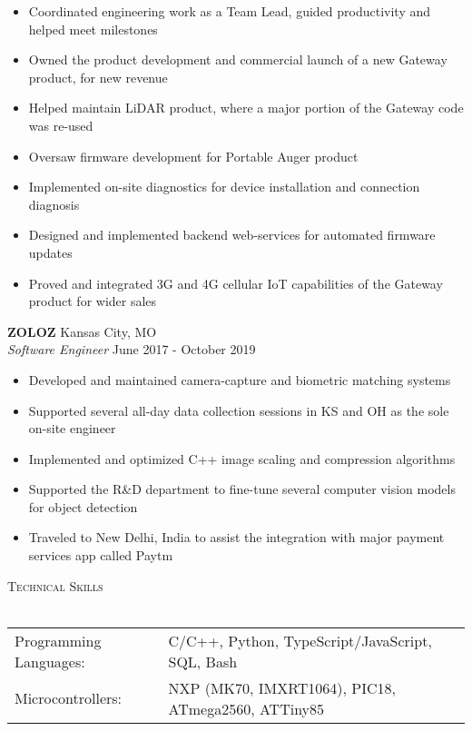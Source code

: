 \documentclass[a4paper]{article}
\newcommand{\lineunder} {
    \vspace*{-8pt} \\
    \hspace*{-18pt} \hrulefill \\
}
\newcommand{\header} [1] {
    {\hspace*{-18pt}\vspace*{6pt} \textsc{#1}}
    \vspace*{-6pt} \lineunder
}
\begin{document}
\begin{itemize} \itemsep 1pt
	\item Coordinated engineering work as a Team Lead, guided productivity and helped meet milestones
	\item Owned the product development and commercial launch of a new Gateway product, for new revenue
	\item Helped maintain LiDAR product, where a major portion of the Gateway code was re-used
	\item Oversaw firmware development for Portable Auger product
	\item Implemented on-site diagnostics for device installation and connection diagnosis
	\item Designed and implemented backend web-services for automated firmware updates
	\item Proved and integrated 3G and 4G cellular IoT capabilities of the Gateway product for wider sales
\end{itemize}
\textbf{ZOLOZ} \hfill Kansas City, MO\\
\textit{Software Engineer} \hfill June 2017 - October 2019\\
\vspace{-1mm}
\begin{itemize} \itemsep 1pt
	\item Developed and maintained camera-capture and biometric matching systems
	\item Supported several all-day data collection sessions in KS and OH as the sole on-site engineer
	\item Implemented and optimized C++ image scaling and compression algorithms
	\item Supported the R\&D department to fine-tune several computer vision models for object detection
	\item Traveled to New Delhi, India to assist the integration with major payment services app called Paytm
\end{itemize}

\header{Technical Skills}
\begin{tabular}{ l l }
    \vspace{1mm}
	Programming Languages: & C/C++, Python, TypeScript/JavaScript, SQL, Bash                            \\
    Microcontrollers:      & NXP (MK70, IMXRT1064), PIC18, ATmega2560, ATTiny85        \\
\end{tabular}
\vspace{5mm}
\end{document}
